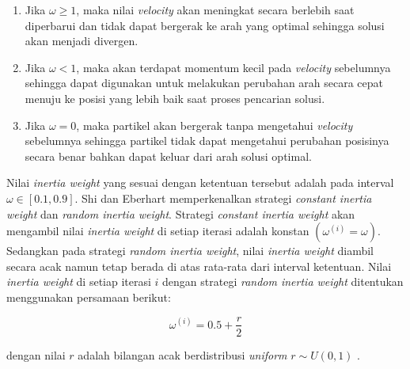 {{\begin{enumerate}[align=left, left=0em, nolistsep]
              \begin{enumerate}[label=(\alph*)., align=left, left=0em, nolistsep]
                  \item Jika $\omega \geq 1$, maka nilai \textit{velocity} akan meningkat secara berlebih saat diperbarui dan tidak dapat bergerak ke arah yang optimal sehingga solusi akan menjadi divergen.
                  \item Jika $\omega < 1$, maka akan terdapat momentum kecil pada \textit{velocity} sebelumnya sehingga dapat digunakan untuk melakukan perubahan arah secara cepat menuju ke posisi yang lebih baik saat proses pencarian solusi.
                  \item Jika $\omega = 0$, maka partikel akan bergerak tanpa mengetahui \textit{velocity} sebelumnya sehingga partikel tidak dapat mengetahui perubahan posisinya secara benar bahkan dapat keluar dari arah solusi optimal.
              \end{enumerate}

              Nilai \textit{inertia weight} yang sesuai dengan ketentuan tersebut adalah pada interval $\omega \in [0.1, 0.9]$.
              Shi dan Eberhart memperkenalkan strategi \textit{constant inertia weight} dan \textit{random inertia weight}.
              Strategi \textit{constant inertia weight} akan mengambil nilai \textit{inertia weight} di setiap iterasi adalah konstan $(\omega^{(i)} = \omega)$.
              Sedangkan pada strategi \textit{random inertia weight}, nilai \textit{inertia weight} diambil secara acak namun tetap berada
              di atas rata-rata dari interval ketentuan. Nilai \textit{inertia weight} di setiap iterasi $i$ dengan strategi \textit{random inertia weight} ditentukan menggunakan persamaan berikut:

              \begin{equation}
                  \omega^{(i)} = 0.5 + \frac{r}{2}
                  \label{pers: random inertia weight}
              \end{equation}

              dengan nilai $r$ adalah bilangan acak berdistribusi \textit{uniform} $r \sim{U(0,1)}$ .
    \end{enumerate}
}

\vspace{-5mm}
}
